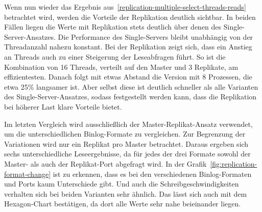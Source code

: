 Wenn nun wieder das Ergebnis aus~\ref{replication-multiple-select-threads-reads} betrachtet wird, werden die Vorteile der Replikation deutlich sichtbar.
In beiden Fällen liegen die Werte mit Replikation stets deutlich über denen des Single-Server-Ansatzes.
Die Performance des Single-Servers bleibt unabhängig von der Threadanzahl nahezu konstant.
Bei der Replikation zeigt sich, dass ein Anstieg an Threads auch zu einer Steigerung der Leseabfragen führt.
So ist die Kombination von 16 Threads, verteilt auf den Master und 3 Replikate, am effizientesten.
Danach folgt mit etwas Abstand die Version mit 8 Prozessen, die etwa 25\% langsamer ist.
Aber selbst diese ist deutlich schneller als alle Varianten des Single-Server-Ansatzes, sodass festgestellt werden kann, dass die Replikation bei höherer Last klare Vorteile bietet.

Im letzten Vergleich wird ausschließlich der Master-Replikat-Ansatz verwendet, um die unterschiedlichen Binlog-Formate zu vergleichen.
Zur Begrenzung der Variationen wird nur ein Replikat pro Master betrachtet.
Daraus ergeben sich sechs unterschiedliche Leseergebnisse, da für jedes der drei Formate sowohl der Master- als auch der Replikat-Port abgefragt wird.
In der Grafik~\ref{fig:replication-format-change} ist zu erkennen, dass es bei den verschiedenen Binlog-Formaten und Ports kaum Unterschiede gibt.
Und auch die Schreibgeschwindigkeiten verhalten sich bei beiden Varianten sehr ähnlich.
Das lässt sich auch mit dem Hexagon-Chart bestätigen, da dort alle Werte sehr nahe beieinander liegen.


